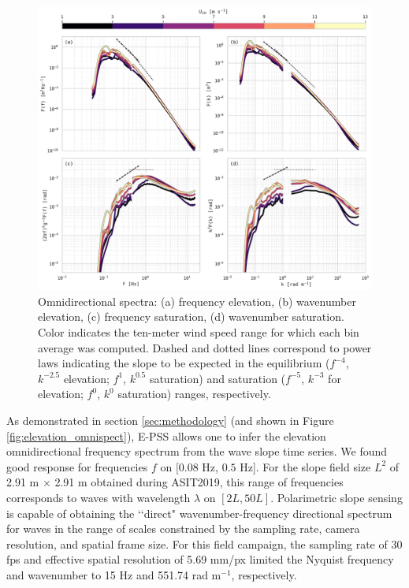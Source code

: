 \documentclass[letterpaper,journal]{IEEEtran}
\begin{document}
\begin{figure}[!ht]
    \centering
    \includegraphics[width=\textwidth]{_figures/omnidirectional_spectra_binned_by_wind.pdf}
    \vspace{-20pt}
\caption{Omnidirectional spectra: (a) frequency elevation, (b) wavenumber elevation, (c) frequency saturation, (d) wavenumber saturation. Color indicates the ten-meter wind speed range for which each bin average was computed. Dashed and dotted lines correspond to power laws indicating the slope to be expected in the equilibrium ($f^{-4}$, $k^{-2.5}$ elevation; $f^{1}$, $k^{0.5}$ saturation) and saturation ($f^{-5}$, $k^{-3}$ for elevation; $f^{0}$, $k^{0}$ saturation) ranges, respectively.}
\label{fig:omnidirectional_spectra_binned_by_wind}
\end{figure}

As demonstrated in section \ref{sec:methodology} (and shown in Figure \ref{fig:elevation_omnispect}), E-PSS allows one to infer the elevation omnidirectional frequency spectrum from the wave slope time series. We found good response for frequencies $f$ on $[0.08$ Hz, $0.5$ Hz]. For the slope field size $L^2$ of 2.91 m $\times$ 2.91 m obtained during ASIT2019, this range of frequencies corresponds to waves with wavelength $\lambda$ on $[2L, 50L]$. Polarimetric slope sensing is capable of obtaining the \lq\lq direct" wavenumber-frequency directional spectrum for waves in the range of scales constrained by the sampling rate, camera resolution, and spatial frame size. For this field campaign, the sampling rate of 30 fps and effective spatial resolution of 5.69 mm/px limited the Nyquist frequency and wavenumber to 15 Hz and 551.74 rad m$^{-1}$, respectively.
\end{document}
